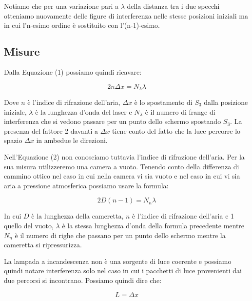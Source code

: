 \documentclass{article}
\begin{document}
\vspace{3mm}

Notiamo che per una variazione pari a $\lambda$ della distanza tra i due specchi otteniamo nuovamente delle figure di interferenza nelle stesse posizioni iniziali ma in cui l'n-esimo ordine è sostituito con l'(n-1)-esimo.

\subsection{Misure}
Dalla Equazione (1) possiamo quindi ricavare:

\begin{equation} 
2 n \Delta{x} = N_\lambda \lambda 
\end{equation}

Dove $n$ è l'indice di rifrazione dell'aria, $\Delta{x}$ è lo spostamento di $S_3$ dalla posizione iniziale, $\lambda$ è la lunghezza d'onda del laser e $N_\lambda$ è il numero di frange di interferenza che si vedono passare per un punto dello schermo spostando $S_3$. La presenza del fattore 2 davanti a $\Delta{x}$ tiene conto del fatto che la luce percorre lo spazio $\Delta x$ in ambedue le direzioni.

\vspace{3mm}

Nell'Equazione (2) non conosciamo tuttavia l'indice di rifrazione dell'aria. Per la sua misura utilizzeremo una camera a vuoto. Tenendo conto della differenza di cammino ottico nel caso in cui nella camera vi sia vuoto e nel caso in cui vi sia aria a pressione atmosferica possiamo usare la formula:

\begin{equation}
 2D (n - 1) = N_n \lambda
\end{equation}

In cui $D$ è la lunghezza della cameretta, $n$ è l'indice di rifrazione dell'aria e 1 quello del vuoto, $\lambda$ è la stessa lunghezza d'onda della formula precedente mentre $N_n$ è il numero di righe che passano per un punto dello schermo mentre la cameretta si ripressurizza.

\vspace{3mm}

La lampada a incandescenza non è una sorgente di luce coerente e possiamo quindi notare interferenza solo nel caso in cui i pacchetti di luce provenienti dai due percorsi si incontrano. Possiamo quindi dire che:

\begin{equation} 
L = \Delta{x} 
\end{equation}
\end{document}
